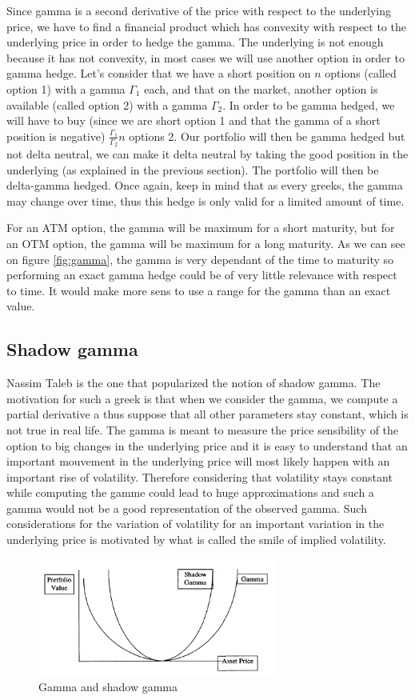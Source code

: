 \documentclass[hidelinks]{article}
\begin{document}
    Since gamma is a second derivative of the price with respect to the underlying price, we have to find a financial product which has convexity with respect to the underlying price in order to hedge the gamma. The underlying is not enough because it has not convexity, in most cases we will use another option in order to gamma hedge. Let's consider that we have a short position on $n$ options (called option 1) with a gamma $\Gamma_1$ each, and that on the market, another option is available (called option 2) with a gamma $\Gamma_2$. In order to be gamma hedged, we will have to buy (since we are short option 1 and that the gamma of a short position is negative) $\frac{\Gamma_1}{\Gamma_2}n$ options 2. Our portfolio will then be gamma hedged but not delta neutral, we can make it delta neutral by taking the good position in the underlying (as explained in the previous section). The portfolio will then be delta-gamma hedged. Once again, keep in mind that as every greeks, the gamma may change over time, thus this hedge is only valid for a limited amount of time.
    
    For an ATM option, the gamma will be maximum for a short maturity, but for an OTM option, the gamma will be maximum for a long maturity. As we can see on figure \ref{fig:gamma}, the gamma is very dependant of the time to maturity so performing an exact gamma hedge could be of very little relevance with respect to time. It would make more sens to use a range for the gamma than an exact value.
    \newpage
    \subsection{Shadow gamma}
    Nassim Taleb is the one that popularized the notion of shadow gamma. The motivation for such a greek is that when we consider the gamma, we compute a partial derivative a thus suppose that all other parameters stay constant, which is not true in real life. The gamma is meant to measure the price sensibility of the option to big changes in the underlying price and it is easy to understand that an important mouvement in the underlying price will most likely happen with an important rise of volatility. Therefore considering that volatility stays constant while computing the gamme could lead to huge approximations and such a gamma would not be a good representation of the observed gamma. Such considerations for the variation of volatility for an important variation in the underlying price is motivated by what is called the smile of implied volatility.
    \begin{figure}[!h]
	\centering
	\includegraphics[width=0.7\textwidth]{shadow_gamma.png}
    \caption{Gamma and shadow gamma}
    \label{fig:shadow_gamma}
    \end{figure}
    
\end{document}
